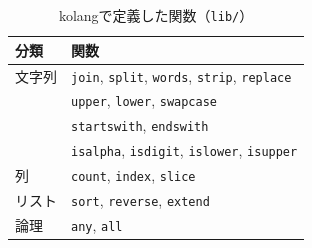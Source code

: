 \documentclass{ipsjprosym}
\begin{document}
\begin{table}[t]
\centering
\caption{kolangで定義した関数（\texttt{lib/}）}
\label{tab:kolang-lib}
\begin{small}
\begin{tabular}{ll}
\toprule
分類 & 関数 \\
\midrule
文字列 & \texttt{join}, \texttt{split}, \texttt{words}, \texttt{strip}, \texttt{replace} \\
       & \texttt{upper}, \texttt{lower}, \texttt{swapcase} \\
       & \texttt{startswith}, \texttt{endswith} \\
       & \texttt{isalpha}, \texttt{isdigit}, \texttt{islower}, \texttt{isupper} \\
列     & \texttt{count}, \texttt{index}, \texttt{slice} \\
リスト & \texttt{sort}, \texttt{reverse}, \texttt{extend} \\
論理   & \texttt{any}, \texttt{all} \\
\bottomrule
\end{tabular}
\end{small}
\end{table}
\end{document}
